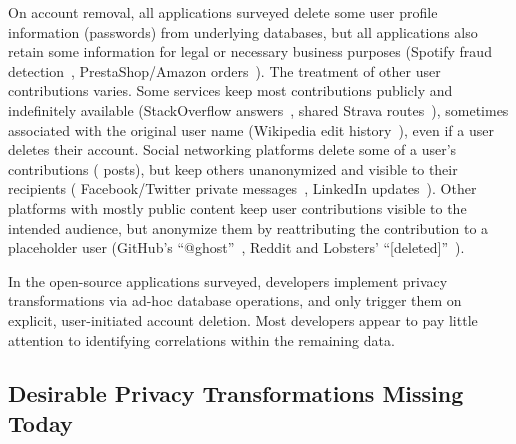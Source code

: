 %
On account removal, all applications surveyed delete some user profile
information (\eg passwords) from underlying databases, but all applications
also retain some information for legal or necessary business purposes
(\eg Spotify fraud detection~\cite{spotify:privacy}, PrestaShop/Amazon
orders~\cite{amazon:privacy, prestashop:privacy}).
%
The treatment of other user contributions varies.
%
Some services keep most contributions publicly and indefinitely available (\eg StackOverflow
answers~\cite{stackoverflow:privacy}, shared Strava routes~\cite{strava:privacy}), sometimes
associated with the original user name (\eg Wikipedia edit history~\cite{wikipedia:privacy}), even
if a user deletes their account.
%
Social networking platforms delete some of a user's contributions (\eg
posts), but keep others unanonymized and visible to their recipients (\eg
Facebook/Twitter private messages~\cite{facebook:privacy, twitter:privacy},
LinkedIn updates~\cite{linkedin:privacy}).
%
Other platforms with mostly public content keep user contributions visible to the intended
audience, but anonymize them by reattributing the contribution to a placeholder user
(\eg GitHub's ``@ghost''~\cite{github:privacy}, Reddit and Lobsters'
``[deleted]''~\cite{reddit:privacy, lobsters:privacy}).
%
%

In the open-source applications surveyed, developers implement privacy transformations
via ad-hoc database operations, and only trigger them on explicit, user-initiated account
deletion.
%
Most developers appear to pay little attention to identifying correlations
within the remaining data.
%


\subsection{Desirable Privacy Transformations Missing Today}

